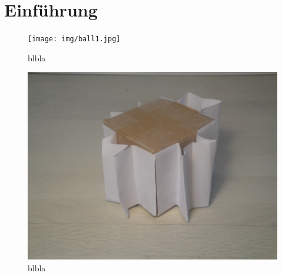 \documentclass{fetch-my-doc}
\begin{document}
	\sloppy
	
	\addtolength{\textheight}{\versch}
	\printtodo
	\tableofcontents
	\clearpage
	
	
	
	\section{Einführung}\label{sec:Einfuehrung}
    
    \begin{center}
      \begin{minipage}[t]{.49\textwidth}
        \begin{figure}[H]%
          \centering%
          \caption{blbla}%
          \label{}%
          \texttt{[image: img/ball1.jpg]}%
        \end{figure}
      \end{minipage}
      \hfill
      \begin{minipage}[t]{.49\textwidth}
        \begin{figure}[H]%
          \centering%
          \caption{blbla}%
          \label{}%
          \includegraphics[width=\columnwidth]{img/ball2.jpg}%
        \end{figure}
      \end{minipage}
    \end{center}
    
\end{document}

